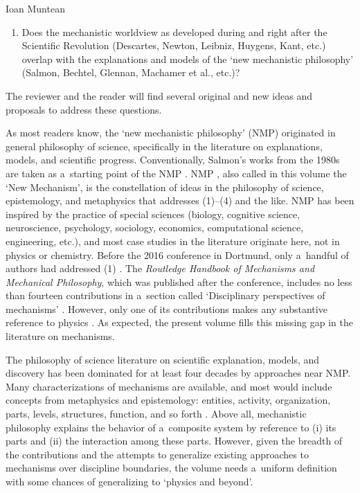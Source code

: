 \begin{recengenv}{Ioan Muntean}
\begin{enumerate}[label={(\arabic*)}]
\item Does the mechanistic worldview as developed during and right after the Scientific Revolution (Descartes, Newton, Leibniz, Huygens, Kant, etc.) overlap with the explanations and models of the ‘new mechanistic philosophy' (Salmon, Bechtel, Glennan, Machamer et al., etc.)?
\end{enumerate}

The reviewer and the reader will find several original and new ideas and proposals to address these questions.

As most readers know, the ‘new mechanistic philosophy' (NMP) originated in general philosophy of science, specifically in the literature on explanations, models, and scientific progress. Conventionally, Salmon's works from the 1980s are taken as a~starting point of the NMP
\parencites[][]{salmon_scientific_1984}[][]{salmon_four_1989}. %
 NMP 
\parencites[][]{glennan_new_2017}[][]{illari_routledge_2017}, %
 also called in this volume the ‘New Mechanism', is the constellation of ideas in the philosophy of science, epistemology, and metaphysics that addresses (1)–(4) and the like. NMP has been inspired by the practice of special sciences (biology, cognitive science, neuroscience, psychology, sociology, economics, computational science, engineering, etc.), and most case studies in the literature originate here, not in physics or chemistry. Before the 2016 conference in Dortmund, only a~handful of authors had addressed (1) 
\parencites[][]{illari_what_2011}[][]{kuhlmann_relation_2014}. %
 The \textit{Routledge Handbook of Mechanisms and Mechanical Philosophy}, which was published after the conference, includes no less than fourteen contributions in a~section called ‘Disciplinary perspectives of mechanisms' 
\parencite[][]{illari_routledge_2017}. %
 However, only one of its contributions makes any substantive reference to physics 
\parencite[][]{kuhlmann_mechanisms_2017}. %
 As expected, the present volume fills this missing gap in the literature on mechanisms.

The philosophy of science literature on scientific explanation, models, and discovery has been dominated for at least four decades by approaches near NMP. Many characterizations of mechanisms are available, and most would include concepts from metaphysics and epistemology: entities, activity, organization, parts, levels, structures, function, and so forth
\parencite[][]{illari_routledge_2017}. %
 Above all, mechanistic philosophy explains the behavior of a~composite system by reference to (i) its parts and (ii) the interaction among these parts. However, given the breadth of the contributions and the attempts to generalize existing approaches to mechanisms over discipline boundaries, the volume needs a~uniform definition with some chances of generalizing to ‘physics and beyond'.


\end{recengenv}
